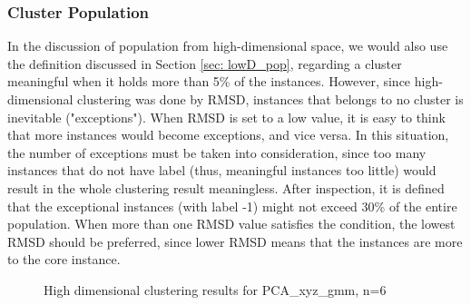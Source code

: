 \documentclass[a4paper]{article}
\begin{document}
\subsubsection{Cluster Population}
In the discussion of population from high-dimensional space, we would also use the definition discussed in Section \ref{sec: lowD_pop}, regarding a cluster meaningful when it holds more than 5\% of the instances. However, since high-dimensional clustering was done by RMSD, instances that belongs to no cluster is inevitable ("exceptions"). When RMSD is set to a low value, it is easy to think that more instances would become exceptions, and vice versa. In this situation, the number of exceptions must be taken into consideration, since too many instances that do not have label (thus, meaningful instances too little) would result in the whole clustering result meaningless. After inspection, it is defined that the exceptional instances (with label -1) might not exceed 30\% of the entire population. When more than one RMSD value satisfies the condition, the lowest RMSD should be preferred, since lower RMSD means that the instances are more to the core instance.

\begin{figure}[H]
    \centering
    \caption{High dimensional clustering results for PCA\_xyz\_gmm, n=6}
    \label{fig: HighD_failure}
\end{figure}
\end{document}
